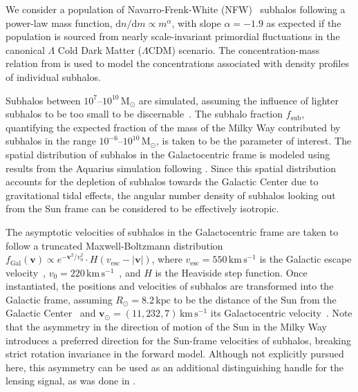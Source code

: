\documentclass[twocolumn,linenumbers]{aastex631}
\begin{document}
 We consider a population of Navarro-Frenk-White (NFW)~\citep{Navarro:1995iw} subhalos following a power-law mass function, $\mathrm dn / \mathrm dm \propto m^\alpha$, with slope $\alpha = -1.9$ as expected if the population is sourced from nearly scale-invariant primordial fluctuations in the canonical $\Lambda$ Cold Dark Matter ($\Lambda$CDM) scenario. The concentration-mass relation from \citet{Sanchez-Conde:2013yxa} is used to model the concentrations associated with density profiles of individual subhalos. 

Subhalos between $10^7$--$10^{10}\,\mathrm{M}_\odot$ are simulated, assuming the influence of lighter subhalos to be too small to be discernable~\citep{Mishra-Sharma:2020ynk}. The subhalo fraction $f_\mathrm{sub}$, quantifying the expected fraction of the mass of the Milky Way contributed by subhalos in the range $10^{-6}$--$10^{10}\,\mathrm{M}_\odot$, is taken to be the parameter of interest. The spatial distribution of subhalos in the Galactocentric frame is modeled using results from the Aquarius simulation following \citet{Hutten:2016jko,Springel:2008cc}. Since this spatial distribution accounts for the depletion of subhalos towards the Galactic Center due to gravitational tidal effects, the angular number density of subhalos looking out from the Sun frame can be considered to be effectively isotropic.

The asymptotic velocities of subhalos in the Galactocentric frame are taken to follow a truncated Maxwell-Boltzmann distribution~\citep{1939isss.book.....C,Lisanti:2016jxe} $f_{\mathrm{Gal}}(\mathbf{v})\propto e^{-\mathbf{v}^{2} / v_{0}^{2}}\cdot H(v_\mathrm{esc} - |\mathbf{v}|)$, where $v_\mathrm{esc} = 550\,\mathrm{km}\,\mathrm{s}^{-1}$ is the Galactic escape velocity~\citep{Piffl:2013mla}, $v_\mathrm{0} = 220\,\mathrm{km}\,\mathrm{s}^{-1}$~\citep{Kerr:1986hz}, and $H$ is the Heaviside step function. Once instantiated, the positions and velocities of subhalos are transformed into the Galactic frame, assuming $R_\odot = 8.2\,\mathrm{kpc}$ to be the distance of the Sun from the Galactic Center~\citep{2019A&A...625L..10G,2020arXiv201202169B} and $\mathbf{v}_{\odot} = (11, 232, 7)\,\mathrm{km}\,\mathrm{s}^{-1}$ its Galactocentric velocity~\citep{2010MNRAS.403.1829S}. Note that the asymmetry in the direction of motion of the Sun in the Milky Way introduces a preferred direction for the Sun-frame velocities of subhalos, breaking strict rotation invariance in the forward model. Although not explicitly pursued here, this asymmetry can be used as an additional distinguishing handle for the lensing signal, as was done in \citet{Mishra-Sharma:2020ynk}.
\end{document}
